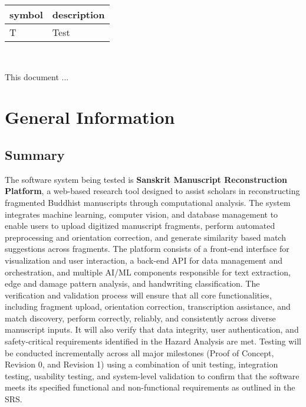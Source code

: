 \documentclass[12pt, titlepage]{article}
\begin{document}
\renewcommand{\arraystretch}{1.2}
\begin{tabular}{l l} 
  \toprule		
  \textbf{symbol} & \textbf{description}\\
  \midrule 
  T & Test\\
  \bottomrule
\end{tabular}\\



\newpage


This document ... 

\section{General Information}

\subsection{Summary}
The software system being tested is \textbf{Sanskrit Manuscript Reconstruction Platform}, a web-based research tool designed to assist scholars in reconstructing fragmented Buddhist manuscripts through computational analysis. The system integrates machine learning, computer vision, and database management to enable users to upload digitized manuscript fragments, perform automated preprocessing and orientation correction, and generate similarity based match suggestions across fragments. 
\newline
The platform consists of a front-end interface for visualization and user interaction, a back-end API for data management and orchestration, and multiple AI/ML components responsible for text extraction, edge and damage pattern analysis, and handwriting classification.  
\newline
The verification and validation process will ensure that all core functionalities, including fragment upload, orientation correction, transcription assistance, and match discovery, perform correctly, reliably, and consistently across diverse manuscript inputs. It will also verify that data integrity, user authentication, and safety-critical requirements identified in the Hazard Analysis are met. 
\newline
Testing will be conducted incrementally across all major milestones (Proof of Concept, Revision 0, and Revision 1) using a combination of unit testing, integration testing, usability testing, and system-level validation to confirm that the software meets its specified functional and non-functional requirements as outlined in the SRS.
  
\end{document}
